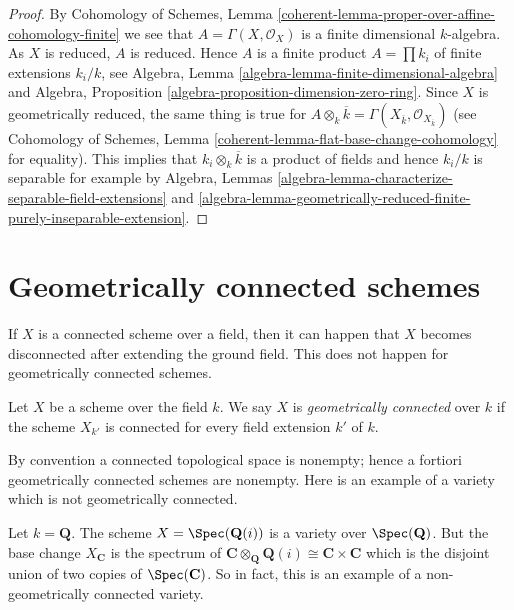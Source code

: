 \begin{proof}
By Cohomology of Schemes, Lemma
\ref{coherent-lemma-proper-over-affine-cohomology-finite}
we see that $A = \Gamma(X, \mathcal{O}_X)$ is a finite dimensional
$k$-algebra. As $X$ is reduced, $A$ is reduced. Hence $A$ is a finite
product $A = \prod k_i$ of finite extensions $k_i/k$, see
Algebra, Lemma \ref{algebra-lemma-finite-dimensional-algebra} and
Algebra, Proposition \ref{algebra-proposition-dimension-zero-ring}.
Since $X$ is geometrically reduced, the same thing is true for
$A \otimes_k \overline{k} =
\Gamma(X_{\overline{k}}, \mathcal{O}_{X_{\overline{k}}})$
(see Cohomology of Schemes, Lemma
\ref{coherent-lemma-flat-base-change-cohomology} for equality).
This implies that $k_i \otimes_k \overline{k}$ is a product
of fields and hence $k_i/k$ is separable for example by
Algebra,
Lemmas \ref{algebra-lemma-characterize-separable-field-extensions} and
\ref{algebra-lemma-geometrically-reduced-finite-purely-inseparable-extension}.
\end{proof}







\section{Geometrically connected schemes}
\label{section-geometrically-connected}

\noindent
If $X$ is a connected scheme over a field, then it can happen that $X$
becomes disconnected after extending the ground field. This does not happen
for geometrically connected schemes.

\begin{definition}
\label{definition-geometrically-connected}
Let $X$ be a scheme over the field $k$. We say $X$ is
{\it geometrically connected} over $k$ if the scheme $X_{k'}$ is connected
for every field extension $k'$ of $k$.
\end{definition}

\noindent
By convention a connected topological space is nonempty; hence a fortiori
geometrically connected schemes are nonempty.
Here is an example of a variety which is not geometrically connected.

\begin{example}
\label{example-not-geometrically-irreducible}
Let $k = \mathbf{Q}$. The scheme
$X = \Spec(\mathbf{Q}(i))$ is a variety over $\Spec(\mathbf{Q})$.
But the base change $X_{\mathbf{C}}$ is the spectrum of
$\mathbf{C} \otimes_{\mathbf{Q}} \mathbf{Q}(i) \cong
\mathbf{C} \times \mathbf{C}$ which is the disjoint union of
two copies of $\Spec(\mathbf{C})$. So in fact, this is an
example of a non-geometrically connected variety.
\end{example}

